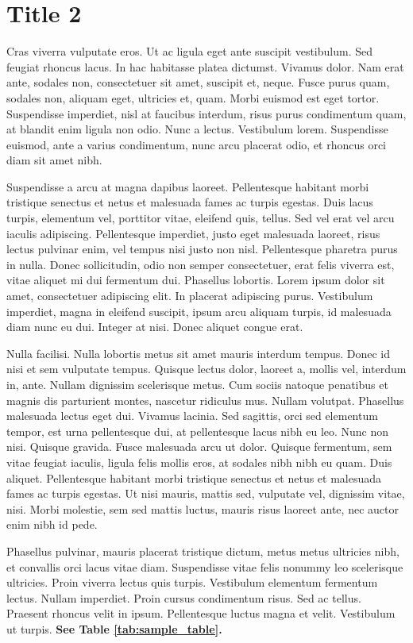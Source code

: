 \documentclass[a4paper,11pt,oneside]{report}
\begin{document}
\chapter{Title 2}
Cras viverra vulputate eros. Ut ac ligula eget ante suscipit vestibulum. Sed
feugiat rhoncus lacus. In hac habitasse platea dictumst. Vivamus dolor. Nam erat
ante, sodales non, consectetuer sit amet, suscipit et, neque. Fusce purus quam,
sodales non, aliquam eget, ultricies et, quam. Morbi euismod est eget tortor.
Suspendisse imperdiet, nisl at faucibus interdum, risus purus condimentum quam,
at blandit enim ligula non odio. Nunc a lectus. Vestibulum lorem. Suspendisse
euismod, ante a varius condimentum, nunc arcu placerat odio, et rhoncus orci
diam sit amet nibh.

Suspendisse a arcu at magna dapibus laoreet. Pellentesque habitant morbi
tristique senectus et netus et malesuada fames ac turpis egestas. Duis lacus
turpis, elementum vel, porttitor vitae, eleifend quis, tellus. Sed vel erat vel
arcu iaculis adipiscing. Pellentesque imperdiet, justo eget malesuada laoreet,
risus lectus pulvinar enim, vel tempus nisi justo non nisl. Pellentesque
pharetra purus in nulla. Donec sollicitudin, odio non semper consectetuer, erat
felis viverra est, vitae aliquet mi dui fermentum dui. Phasellus lobortis. Lorem
ipsum dolor sit amet, consectetuer adipiscing elit. In placerat adipiscing
purus. Vestibulum imperdiet, magna in eleifend suscipit, ipsum arcu aliquam
turpis, id malesuada diam nunc eu dui. Integer at nisi. Donec aliquet congue
erat.

Nulla facilisi. Nulla lobortis metus sit amet mauris interdum tempus. Donec id
nisi et sem vulputate tempus. Quisque lectus dolor, laoreet a, mollis vel,
interdum in, ante. Nullam dignissim scelerisque metus. Cum sociis natoque
penatibus et magnis dis parturient montes, nascetur ridiculus mus. Nullam
volutpat. Phasellus malesuada lectus eget dui. Vivamus lacinia. Sed sagittis,
orci sed elementum tempor, est urna pellentesque dui, at pellentesque lacus nibh
eu leo. Nunc non nisi. Quisque gravida. Fusce malesuada arcu ut dolor. Quisque
fermentum, sem vitae feugiat iaculis, ligula felis mollis eros, at sodales nibh
nibh eu quam. Duis aliquet. Pellentesque habitant morbi tristique senectus et
netus et malesuada fames ac turpis egestas. Ut nisi mauris, mattis sed,
vulputate vel, dignissim vitae, nisi. Morbi molestie, sem sed mattis luctus,
mauris risus laoreet ante, nec auctor enim nibh id pede.

Phasellus pulvinar, mauris placerat tristique dictum, metus metus ultricies
nibh, et convallis orci lacus vitae diam. Suspendisse vitae felis nonummy leo
scelerisque ultricies. Proin viverra lectus quis turpis. Vestibulum elementum
fermentum lectus. Nullam imperdiet. Proin cursus condimentum risus. Sed ac
tellus. Praesent rhoncus velit in ipsum. Pellentesque luctus magna et velit.
Vestibulum ut turpis. \textbf{See Table \ref{tab:sample_table}.}
\end{document}
